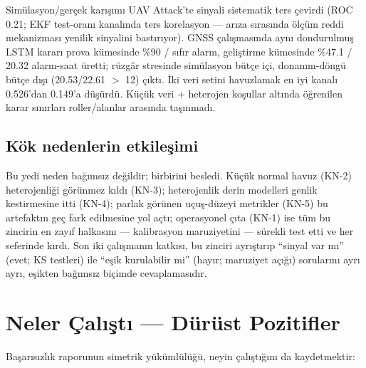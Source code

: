 \documentclass[11pt,a4paper]{article}
\begin{document}
Simülasyon/gerçek karışımı UAV Attack'te sinyali sistematik ters çevirdi
(ROC 0.21; EKF test-oranı kanalında ters korelasyon --- arıza sırasında ölçüm
reddi mekanizması yenilik sinyalini bastırıyor). GNSS çalışmasında aynı
dondurulmuş LSTM kararı prova kümesinde \%90 / sıfır alarm, geliştirme
kümesinde \%47.1 / 20.32 alarm-saat üretti; rüzgâr stresinde simülasyon bütçe
içi, donanım-döngü bütçe dışı (20.53/22.61 $>$ 12) çıktı. İki veri setini
havuzlamak en iyi kanalı 0.526'dan 0.149'a düşürdü. Küçük veri + heterojen
koşullar altında öğrenilen karar sınırları roller/alanlar arasında taşınmadı.

\subsection{Kök nedenlerin etkileşimi}

Bu yedi neden bağımsız değildir; birbirini besledi. Küçük normal havuz (KN-2)
heterojenliği görünmez kıldı (KN-3); heterojenlik derin modelleri genlik
kestirmesine itti (KN-4); parlak görünen uçuş-düzeyi metrikler (KN-5) bu
artefaktın geç fark edilmesine yol açtı; operasyonel çıta (KN-1) ise tüm bu
zincirin en zayıf halkasını --- kalibrasyon maruziyetini --- sürekli test etti
ve her seferinde kırdı. Son iki çalışmanın katkısı, bu zinciri ayrıştırıp
``sinyal var mı'' (evet; KS testleri) ile ``eşik kurulabilir mi'' (hayır;
maruziyet açığı) sorularını ayrı ayrı, eşikten bağımsız biçimde
cevaplamasıdır.

\section{Neler Çalıştı --- Dürüst Pozitifler}

Başarısızlık raporunun simetrik yükümlülüğü, neyin çalıştığını da kaydetmektir:
\end{document}
